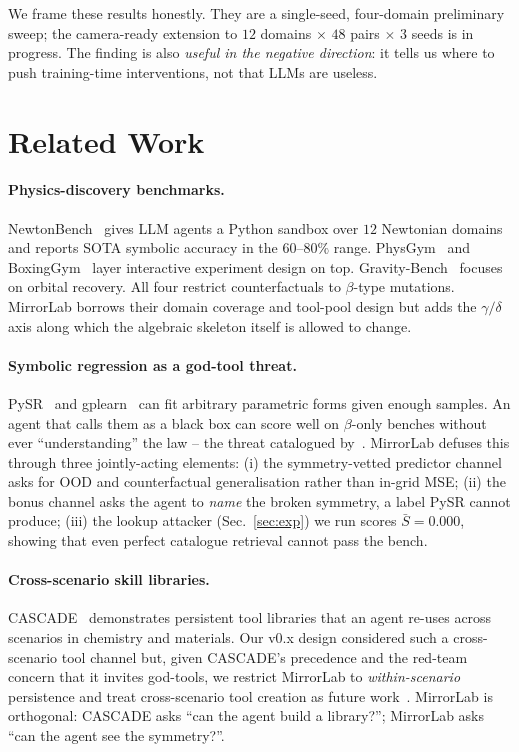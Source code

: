 \documentclass{article}
\begin{document}
We frame these results honestly. They are a single-seed, four-domain
preliminary sweep; the camera-ready extension to $12$ domains $\times$
$48$ pairs $\times$ $3$ seeds is in progress. The finding is also
\emph{useful in the negative direction}: it tells us where to push
training-time interventions, not that LLMs are useless.

\section{Related Work}
\label{sec:related}

\paragraph{Physics-discovery benchmarks.}
NewtonBench~\citep{newtonbench} gives LLM agents a Python sandbox over
$12$ Newtonian domains and reports SOTA symbolic accuracy in the
$60$--$80\%$ range. PhysGym~\citep{physgym} and
BoxingGym~\citep{boxinggym} layer interactive experiment design on top.
Gravity-Bench~\citep{gravitybench} focuses on orbital recovery. All four
restrict counterfactuals to $\beta$-type mutations. MirrorLab borrows
their domain coverage and tool-pool design but adds the $\gamma/\delta$
axis along which the algebraic skeleton itself is allowed to change.

\paragraph{Symbolic regression as a god-tool threat.}
PySR~\citep{pysr} and gplearn~\citep{gplearn} can fit arbitrary parametric
forms given enough samples. An agent that calls them as a black box can
score well on $\beta$-only benches without ever ``understanding'' the
law -- the threat catalogued by~\citet{r5elegant}. MirrorLab defuses this
through three jointly-acting elements: (i) the symmetry-vetted predictor
channel asks for OOD and counterfactual generalisation rather than in-grid
MSE; (ii) the bonus channel asks the agent to \emph{name} the broken
symmetry, a label PySR cannot produce; (iii) the lookup attacker
(Sec.~\ref{sec:exp}) we run scores $\bar S = 0.000$, showing that even
perfect catalogue retrieval cannot pass the bench.

\paragraph{Cross-scenario skill libraries.}
CASCADE~\citep{cascade} demonstrates persistent tool libraries that an
agent re-uses across scenarios in chemistry and materials. Our v0.x
design considered such a cross-scenario tool channel but, given
CASCADE's precedence and the red-team concern that it invites god-tools,
we restrict MirrorLab to \emph{within-scenario} persistence and treat
cross-scenario tool creation as future work~\citep{r3prior}. MirrorLab
is orthogonal: CASCADE asks ``can the agent build a library?'';
MirrorLab asks ``can the agent see the symmetry?''.
\end{document}
